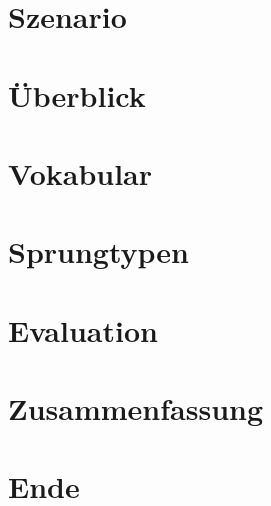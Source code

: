 \documentclass[hyperref={pdfpagelabels=false},usepdftitle=false]{beamer}
\begin{document}
\title{\titleText}
\subtitle{}
\author{\tutor}
\date{25. Februar 2014}
\subject{Proseminar Informatik}

\frame{\titlepage}


\section{Szenario}


\section{Überblick}


\section{Vokabular}


\section{Sprungtypen}


\section{Evaluation}


\section{Zusammenfassung}


\section{Ende}

\end{document}
